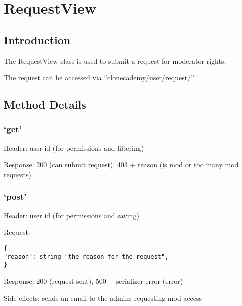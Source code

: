 \chapter*{RequestView}

\section*{Introduction}\label{introduction}

The RequestView class is used to submit a request for moderator rights.

The request can be accessed via ``clonecademy/user/request/''

\section*{Method Details}\label{method-details}

\subsection*{\texorpdfstring{`get'}{get}}\label{get}

Header: user id (for permissions and filtering)

Response: 200 (can submit request), 403 + reason (is mod or too many mod
requests)

\subsection*{\texorpdfstring{`post'}{post}}\label{post}

Header: user id (for permissions and saving)

Request:

\begin{verbatim}
{
"reason": string "the reason for the request",
}
\end{verbatim}

Response: 200 (request sent), 500 + serializer error (error)

Side effects: sends an email to the admins requesting mod access

